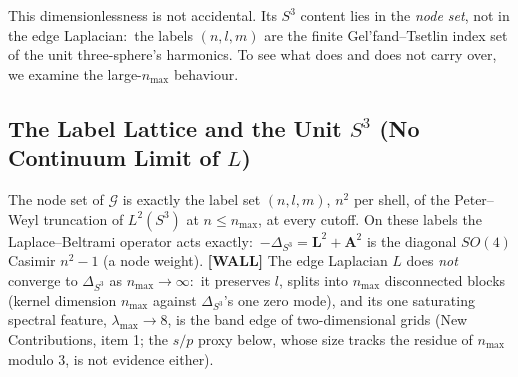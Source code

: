 \documentclass[aps,pra,twocolumn,superscriptaddress,longbibliography]{revtex4-2}
\begin{document}
This dimensionlessness is not accidental. Its $S^3$ content lies in the \emph{node set}, not in the edge Laplacian:\ the labels $(n,l,m)$ are the finite Gel'fand--Tsetlin index set of the unit three-sphere's harmonics. To see what does and does not carry over, we examine the large-$n_{\max}$ behaviour.

\subsection{The Label Lattice and the Unit $S^3$ (No Continuum Limit of $L$)}

The node set of $\mathcal{G}$ is exactly the label set $(n,l,m)$, $n^2$ per shell, of the Peter--Weyl truncation of $L^2(S^3)$ at $n \le n_{\max}$, at every cutoff. On these labels the Laplace--Beltrami operator acts exactly:\ $-\Delta_{S^3} = \mathbf{L}^2 + \mathbf{A}^2$ is the diagonal $SO(4)$ Casimir $n^2 - 1$ (a node weight). \textbf{[WALL]} The edge Laplacian $L$ does \emph{not} converge to $\Delta_{S^3}$ as $n_{\max} \to \infty$:\ it preserves $l$, splits into $n_{\max}$ disconnected blocks (kernel dimension $n_{\max}$ against $\Delta_{S^3}$'s one zero mode), and its one saturating spectral feature, $\lambda_{\max} \to 8$, is the band edge of two-dimensional grids (New Contributions, item 1; the $s/p$ proxy below, whose size tracks the residue of $n_{\max}$ modulo $3$, is not evidence either).
\end{document}
